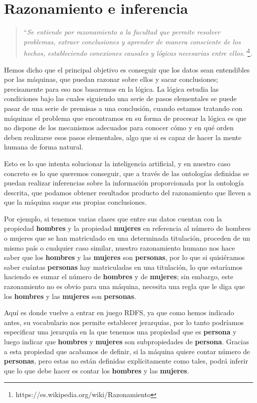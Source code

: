 \section{Razonamiento e inferencia}

\begin{quote}``\textit{Se entiende por razonamiento a la facultad que permite resolver problemas, extraer conclusiones y aprender de manera consciente de los hechos, estableciendo conexiones causales y lógicas necesarias entre ellos."}\footnote{https://es.wikipedia.org/wiki/Razonamiento}.\end{quote}

\bigskip
Hemos dicho que el principal objetivo es conseguir que los datos sean entendibles por las máquinas, que puedan razonar sobre ellos y sacar conclusiones; precisamente para eso nos basaremos en la lógica. La lógica estudia las condiciones bajo las cuales siguiendo una serie de pasos elementales se puede pasar de una serie de premisas a una conclusión, cuando estamos tratando con máquinas el problema que encontramos en su forma de procesar la lógica es que no dispone de los mecanismos adecuados para conocer cómo y en qué orden deben realizarse esos pasos elementales, algo que si es capaz de hacer la mente humana de forma natural. 

\bigskip
Esto es lo que intenta solucionar la inteligencia artificial, y en nuestro caso concreto es lo que queremos conseguir, que a través de las ontologías definidas se puedan realizar inferencias sobre la información proporcionada por la ontología descrita, que podamos obtener resultados producto del razonamiento que lleven a que la máquina saque sus propias conclusiones.

\bigskip
Por ejemplo, si tenemos varias clases que entre sus datos cuentan con la propiedad \textbf{hombres} y la propiedad \textbf{mujeres} en referencia al número de hombres o mujeres que se han matriculado en una determinada titulación, proceden de un mismo país o cualquier caso similar, nuestro razonamiento humano nos hace saber que los \textbf{hombres} y las \textbf{mujeres} son \textbf{personas}, por lo que si quisiéramos saber cuántas \textbf{personas} hay matriculadas en una titulación, lo que estaríamos haciendo es sumar el número de \textbf{hombres} y de \textbf{mujeres}; sin embargo, este razonamiento no es obvio para una máquina, necesita una regla que le diga que los \textbf{hombres} y las \textbf{mujeres} son \textbf{personas}.

\bigskip
Aquí es donde vuelve a entrar en juego {\sf RDFS}, ya que como hemos indicado antes, su vocabulario nos permite establecer jerarquías, por lo tanto podríamos especificar una jerarquía en la que tenemos una propiedad que es \textbf{persona} y luego indicar que \textbf{hombres} y \textbf{mujeres} son subpropiedades de \textbf{persona}. Gracias a esta propiedad que acabamos de definir, si la máquina quiere contar número de \textbf{personas}, pero estas no están definidas explícitamente como tales, podrá inferir que lo que debe hacer es contar los \textbf{hombres} y las \textbf{mujeres}.